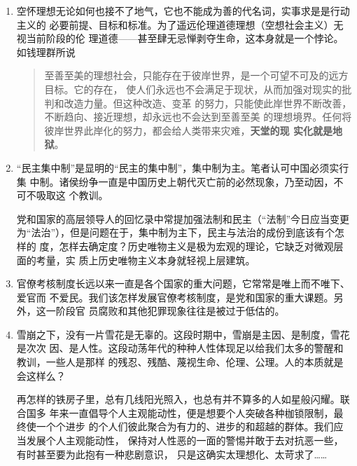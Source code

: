 {\begin{enumerate}
  但理论是抽象、枯燥、片面、书面的；而现实是综合、立体、具体、生动鲜活的；政
  治又是现实实践的，交织着种种人性私欲。正如扉页引用的黑格尔话语“人民和政府
  从来就没有从历史中学到任何东西……”

  中国这一段历史犯有一些与苏联异曲同工的错误，可见前
  文，。

\item 空怀理想无论如何也接不了地气，它也不能成为善的代名词，实事求是是行动主义的
  必要前提、目标和标准。为了遥远伦理道德理想（空想社会主义）无视当前阶段的伦
  理道德——甚至肆无忌惮剥夺生命，这本身就是一个悖论。如钱理群所说
  \begin{quotation}
    至善至美的理想社会，只能存在于彼岸世界，是一个可望不可及的远方目标。它的存在，
    使人们永远也不会满足于现状，从而加强对现实的批判和改造力量。但这种改造、变革
    的努力，只能使此岸世界不断改善，不断趋向、接近理想，却永远也不会达到至善至美
    的理想境界。任何将彼岸世界此岸化的努力，都会给人类带来灾难，\textbf{天堂的现
      实化就是地狱}。
  \end{quotation}

\item “民主集中制”是显明的“民主的集中制”，集中制为主。笔者认可中国必须实行集
  中制。诸侯纷争一直是中国历史上朝代灭亡前的必然现象，乃至动因，不可不吸取这
  个教训。

  党和国家的高层领导人的回忆录中常提加强法制和民主（“法制”今日应当变更
  为“法治”），但是问题在于，集中制为主下，民主与法治的成份到底该有个怎样的
  度，怎样去确定度？历史唯物主义是极为宏观的理论，它缺乏对微观层面的考量，实
  质上历史唯物主义本身就轻视上层建筑。

\item 官僚考核制度长远以来一直是各个国家的重大问题，它常常是唯上而不唯下、爱官而
  不爱民。我们该怎样发展官僚考核制度，是党和国家的重大课题。另外，这一阶段官
  员腐败和其他犯罪现象往往是被过于低估的。

\item 雪崩之下，没有一片雪花是无辜的。这段时期中，雪崩是主因、是制度，雪花是次次
  因、是人性。这段动荡年代的种种人性体现足以给我们太多的警醒和教训，一些人是那样
  的残忍、残酷、蔑视生命、伦理、公理。人的本质就是会这样么？

  再怎样的铁房子里，总有几线阳光照入，也总有并不算多的人如星般闪耀。联合国多
  年来一直倡导个人主观能动性，便是想要个人突破各种枷锁限制，最终使一个个进步
  的个人们彼此聚合为有力的、进步的和超越的群体。我们应当发展个人主观能动性，
  保持对人性恶的一面的警惕并敢于去对抗恶一些，有时甚至要为此抱有一种悲剧意识，
  只是这确实太理想化、太苛求了……
\end{enumerate}

}
